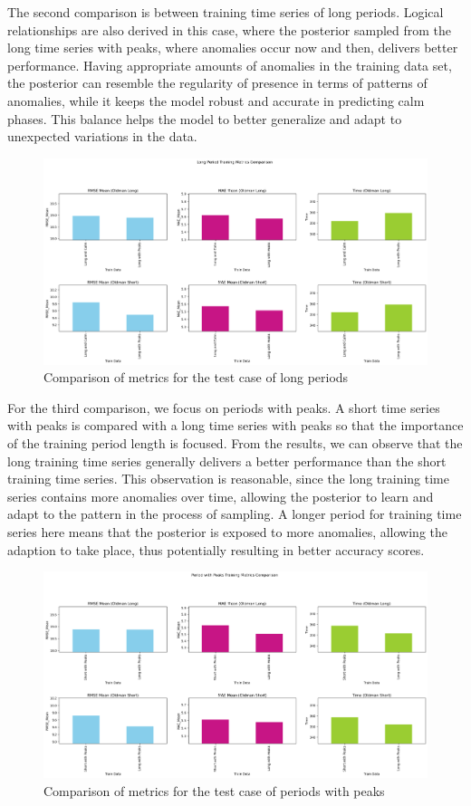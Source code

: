 The second comparison is between training time series of long periods. Logical relationships are also derived in this case, where the posterior sampled from the long time series with peaks, where anomalies occur now and then, delivers better performance. Having appropriate amounts of anomalies in the training data set, the posterior can resemble the regularity of presence in terms of patterns of anomalies, while it keeps the model robust and accurate in predicting calm phases. This balance helps the model to better generalize and adapt to unexpected variations in the data.
\begin{figure}[H]
    \centering
    \includegraphics[width=.8\textwidth]{figures/time_series_analysis/comparison/long_period.png}
    \captionsetup{width=.8\textwidth}
    \caption{Comparison of metrics for the test case of long periods}
    \label{fig:enter-label}
\end{figure}

For the third comparison, we focus on periods with peaks. A short time series with peaks is compared with a long time series with peaks so that the importance of the training period length is focused. From the results, we can observe that the long training time series generally delivers a better performance than the short training time series. This observation is reasonable, since the long training time series contains more anomalies over time, allowing the posterior to learn and adapt to the pattern in the process of sampling. A longer period for training time series here means that the posterior is exposed to more anomalies, allowing the adaption to take place, thus potentially resulting in better accuracy scores.

\begin{figure}[H]
    \centering
    \includegraphics[width=.8\textwidth]{figures/time_series_analysis/comparison/period_with_peaks.png}
    \captionsetup{width=.8\textwidth}
    \caption{Comparison of metrics for the test case of periods with peaks}
    \label{fig:enter-label}
\end{figure}

